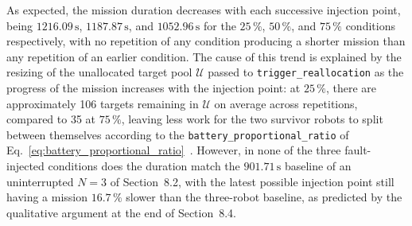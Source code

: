\begin{table}[htbp]
\centering
\caption{Mission outcome as a function of failure-injection timing, three runs per condition.}
\label{tab:injection_timing_summary}
\end{table}

As expected, the mission duration decreases with each successive injection point, being $1216.09\,\text{s}$, $1187.87\,\text{s}$, and $1052.96\,\text{s}$ for the $25\,\%$, $50\,\%$, and $75\,\%$ conditions respectively, with no repetition of any condition producing a shorter mission than any repetition of an earlier condition. The cause of this trend is explained by the resizing of the unallocated target pool $\mathcal{U}$ passed to \texttt{trigger\_reallocation} as the progress of the mission increases with the injection point: at $25\,\%$, there are approximately 106 targets remaining in $\mathcal{U}$ on average across repetitions, compared to 35 at $75\,\%$, leaving less work for the two survivor robots to split between themselves according to the \texttt{battery\_proportional\_ratio} of Eq.~\eqref{eq:battery_proportional_ratio}~\cite{hamidoglu2026survey}. However, in none of the three fault-injected conditions does the duration match the $901.71\,\text{s}$ baseline of an uninterrupted $N=3$ of Section~8.2, with the latest possible injection point still having a mission $16.7\,\%$ slower than the three-robot baseline, as predicted by the qualitative argument at the end of Section~8.4.

